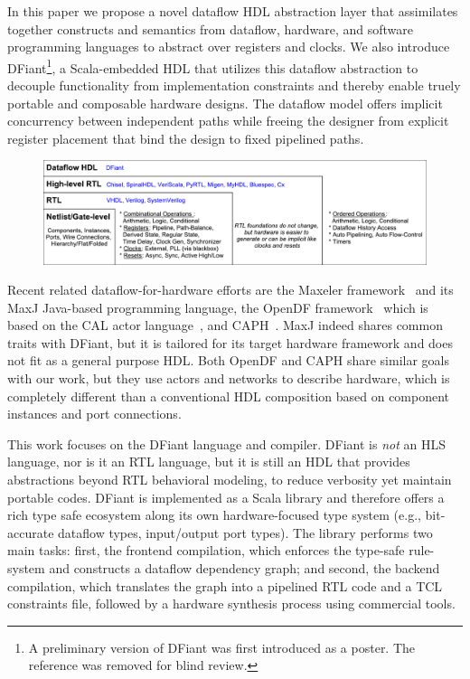 In this paper we propose a novel dataflow HDL abstraction layer that assimilates together constructs and semantics from dataflow\cite{le1986signal, Thuau1991}, hardware, and software programming languages to abstract over registers and clocks. We also introduce DFiant\footnote{A preliminary version of DFiant was first introduced as a poster. The reference was removed for blind review.}, a Scala-embedded HDL that utilizes this dataflow abstraction to decouple functionality from implementation constraints and thereby enable truely portable and composable hardware designs. The dataflow model offers implicit concurrency between independent paths while freeing the designer from explicit register placement that bind the design to fixed pipelined paths.  

\begin{figure}[t]
	\centering
	\captionsetup{justification=centering}
	\includegraphics[width=\linewidth]{graphics/motivation.pdf} 
	\label{fig:motivation}
\end{figure}

Recent related dataflow-for-hardware efforts are the Maxeler framework~\cite{Pell2011} and its MaxJ Java-based programming language, the OpenDF framework~\cite{bhattacharyya2008opendf} which is based on the CAL actor language~\cite{eker2003cal}, and CAPH~\cite{serot2011implementing}. MaxJ indeed shares common traits with DFiant, but it is tailored for its target hardware framework and does not fit as a general purpose HDL. Both OpenDF and CAPH share similar goals with our work, but they use actors and networks to describe hardware, which is completely different than a conventional HDL composition based on component instances and port connections.

This work focuses on the DFiant language and compiler. DFiant is \emph{not} an HLS language, nor is it an RTL language, but it is still an HDL that provides abstractions beyond RTL behavioral modeling, to reduce verbosity yet maintain portable codes.
DFiant is implemented as a Scala library and therefore offers a rich type safe ecosystem along its own hardware-focused type system (e.g., bit-accurate dataflow types, input/output port types). The library performs two main tasks: first, the frontend compilation, which enforces the type-safe rule-system and constructs a dataflow dependency graph; and second, the backend compilation, which translates the graph into a pipelined RTL code and a TCL constraints file, followed by a hardware synthesis process using commercial tools. 

